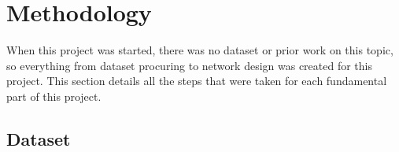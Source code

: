 \documentclass[a4paper,11pt,notitlepage]{article}
\begin{document}
\section{Methodology}


When this project was started, there was no dataset or prior work on this topic, so everything from dataset procuring to network design was created for this project. This section details all the steps that were taken for each fundamental part of this project.

\subsection{Dataset}

\end{document}
